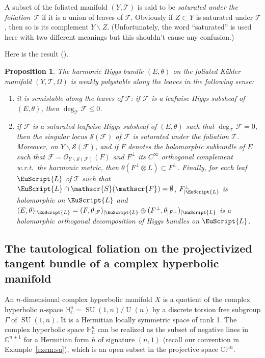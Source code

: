 \documentclass[JEP,XML,SOM,Unicode,NoFloatCountersInSection]{cedram}
\let\mathcal\mathscr
\newcommand{\citestar}[3]{\cite[#3]{#1}}
\newcommand{\Leaf}{\EuScript{L}}
\theoremstyle{plain}
\newtheorem{prop}[theo]{Proposition}
\theoremstyle{definition}
\DeclareMathOperator{\SU}{SU}
\DeclareMathOperator{\rU}{U}
\newcommand{\cF}{\mathcal{F}}
\newcommand{\cO}{\mathcal{O}}
\newcommand{\cS}{\mathcal{S}}
\newcommand{\cT}{\mathcal{T}}
\newcommand{\bC}{\mathbb{C}}
\newcommand{\bCP}{\mathbb{CP}}
\newcommand{\HC}{{\mathbb{H}^n_\mathbb{C}}}
\begin{document}
A subset of the foliated manifold $(Y,\cT)$ is said to be \emph{saturated under the foliation~$\cT$} if it is a
union of leaves of $\cT$. Obviously if $Z\subset Y$ is saturated under $\cT$, then so is its
complement $ Y\backslash Z$.
(Unfortunately, the word ``saturated'' is used here with two different
meanings but this shouldn't cause any confusion.)

Here is the result (\citestar{KM}*{Prop.\,2.2}).

\begin{prop}\label{prop:polystab}
The harmonic Higgs bundle $(E,\theta)$ on the
foliated Kähler manifold $(Y,\cT,\Omega)$ is \emph{weakly polystable along the leaves} in the following sense:
\begin{enumerate}
\item\label{prop:polystab1} it is \emph{semistable along the leaves} of $\cT$: if $\cF$ is a leafwise Higgs
subsheaf of $(E,\theta)$, then $\deg_\cT\cF\leq 0$.
\item\label{prop:polystab2} if $\cF$ is a saturated leafwise Higgs subsheaf of $(E,\theta)$ such that $\deg_\cT\cF=0$, then the
singular locus $\cS(\cF)$ of $\cF$ is saturated under the foliation $\cT$. Moreover, on $Y\backslash
\cS(\cF)$, and if $F$ denotes the holomorphic subbundle of $E$ such that $\cF=\cO_{Y\backslash\cS(\cF)}(F)$ and $F^\perp$ its $C^\infty$
orthogonal complement w.r.t.\ the harmonic metric, then $\theta(F^\perp\otimes L)\subset F^\perp$. Finally,
for each leaf $\Leaf$ of $\cT$ such that $\Leaf\cap\cS(\cF)=\emptyset$, $F^\perp_{|\Leaf}$ is
holomorphic on $\Leaf$
and $(E,\theta)_{|\Leaf}=(F,\theta_{|F})_{|\Leaf}\oplus(F^\perp,\theta_{|F^\perp})_{|\Leaf}$ is a holomorphic
orthogonal decomposition of Higgs bundles on $\Leaf$.
\end{enumerate}
\end{prop}

\subsection{The tautological foliation on the projectivized tangent bundle of a complex hyperbolic
manifold}\label{subsec:toto}

An $n$-dimensional complex hyperbolic manifold $X$ is a quotient of the complex hyperbolic $n$-space
$\HC=\SU(1,n)/\rU(n)$ by a discrete torsion free subgroup $\Gamma$ of $\SU(1,n)$. It is a Hermitian
locally symmetric space of rank 1.
The complex hyperbolic space $\HC$ can be realized as the subset of
negative lines in $\bC^{n+1}$ for a Hermitian form $h$ of signature $(n,1)$
(recall our convention in Example~\ref{exem:su}), which is an open subset in
the projective space $\bCP^n$.\enlargethispage{.5\baselineskip}%
\end{document}
